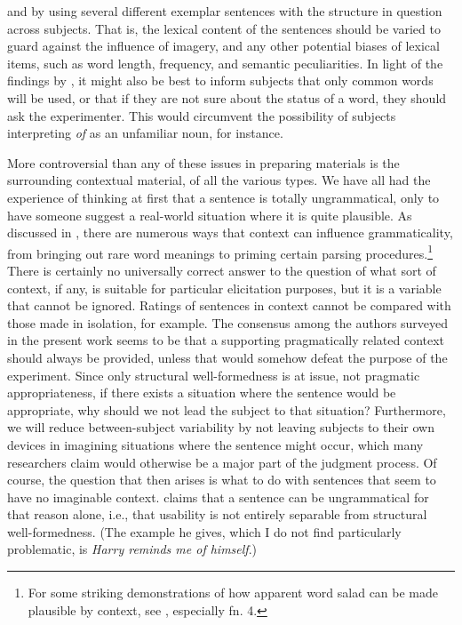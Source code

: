   and by using several different exemplar sentences with the structure in question across subjects. That is, the lexical content of the sentences should be varied to guard against the influence of imagery, and any other potential biases of lexical items, such as word length, frequency, and semantic peculiarities. In light of the findings by \citet{Hill1961}, it might also be best to inform subjects
 that only common words will be used, or that if they are not sure about the status of a word, they should ask the experimenter. This would circumvent the possibility of subjects interpreting \textit{of} as an unfamiliar noun, for instance.

 More controversial than any of these issues in preparing materials is the surrounding contextual material, of all the various types. We have all had the experience of thinking at first that a sentence is totally ungrammatical, only to have someone suggest a real-world situation where it is quite plausible. As discussed in , there are numerous ways that context can influence grammaticality, from bringing out rare word meanings to priming certain parsing procedures.\footnote{For some striking demonstrations of how apparent word salad can be made plausible by context, see \citet{Hill1961}, especially fn. 4.}
  There is certainly no universally correct answer to the question of what sort of context, if any, is suitable for particular elicitation purposes, but it is a variable that cannot be ignored. Ratings of sentences in context cannot be compared with those made in isolation, for example. The consensus among the authors surveyed in the present work seems to be that a supporting pragmatically related context should always be provided, unless that would somehow defeat the purpose of the experiment. Since only structural well-formedness is at issue, not pragmatic appropriateness, if there exists a situation where the sentence would be appropriate, why should we not lead the subject to that situation? Furthermore, we will reduce between-subject variability by not leaving subjects to their own devices in imagining situations where the sentence might occur, which many researchers claim would otherwise be a major part of the judgment process. Of course, the question that then arises is what to do with sentences that seem to have no imaginable context. \citet{Householder1973} claims that a sentence can be ungrammatical for that reason alone, i.e., that usability is not entirely separable from structural well-formedness. (The example he gives, which I do not find particularly problematic, is \textit{Harry reminds me of himself}.)

